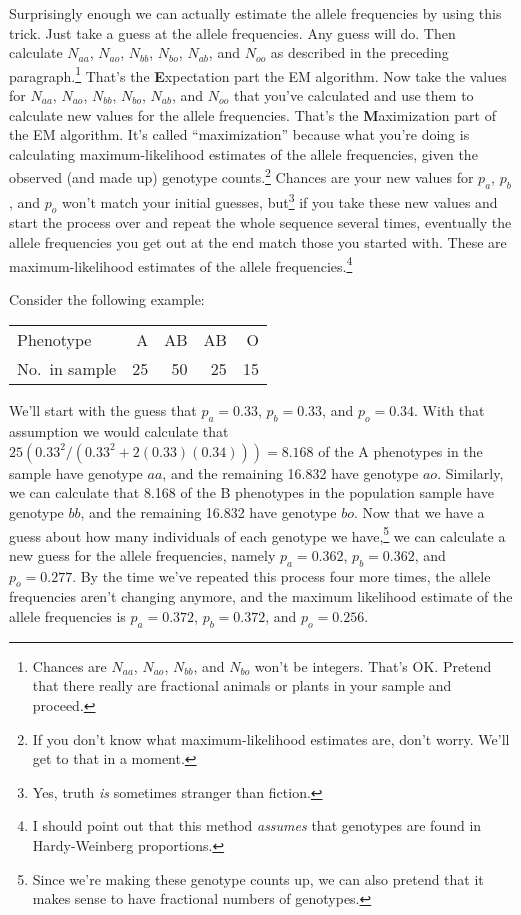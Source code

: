 Surprisingly enough we can actually estimate the allele frequencies by
using this trick. Just take a guess at the allele frequencies. Any
guess will do. Then calculate $N_{aa}$, $N_{ao}$, $N_{bb}$, $N_{bo}$,
$N_{ab}$, and $N_{oo}$ as described in the preceding
paragraph.\footnote{Chances are $N_{aa}$, $N_{ao}$, $N_{bb}$, and
  $N_{bo}$ won't be integers. That's OK. Pretend that there really are
  fractional animals or plants in your sample and proceed.} That's the
{\bf E}xpectation part the EM algorithm. Now take the values for
$N_{aa}$, $N_{ao}$, $N_{bb}$, $N_{bo}$, $N_{ab}$, and $N_{oo}$ that
you've calculated and use them to calculate new values for the allele
frequencies. That's the {\bf M}aximization part of the EM
algorithm. It's called ``maximization'' because what you're doing is
calculating maximum-likelihood estimates of the allele frequencies,
given the observed (and made up) genotype counts.\footnote{If you
  don't know what maximum-likelihood estimates are, don't worry. We'll
  get to that in a moment.} Chances are your new values for $p_a$,
$p_b$, and $p_o$ won't match your initial guesses, but\footnote{Yes,
  truth {\it is\/} sometimes stranger than fiction.}  if you take
these new values and start the process over and repeat the whole
sequence several times, eventually the allele frequencies you get out
at the end match those you started with. These are maximum-likelihood
estimates of the allele frequencies.\footnote{I should point out that
  this method {\it assumes\/} that genotypes are found in
  Hardy-Weinberg proportions.}

Consider the following example:
\begin{center}
\begin{tabular}{l|rrrr}
\hline\hline
Phenotype      & A      & AB      & AB     & O  \\
No.\ in sample & 25     & 50      & 25     & 15 \\
\hline
\end{tabular}
\end{center}
We'll start with the guess that $p_a = 0.33$, $p_b = 0.33$, and
$p_o = 0.34$. With that assumption we would calculate that
$25(0.33^2/(0.33^2 + 2(0.33)(0.34))) = 8.168$ of the A phenotypes in
the sample have genotype $aa$, and the remaining 16.832 have genotype
$ao$. Similarly, we can calculate that 8.168 of the B phenotypes in
the population sample have genotype $bb$, and the remaining 16.832
have genotype $bo$. Now that we have a guess about how many
individuals of each genotype we have,\footnote{Since we're making
  these genotype counts up, we can also pretend that it makes sense to
  have fractional numbers of genotypes.} we can calculate a new guess
for the allele frequencies, namely $p_a = 0.362$, $p_b = 0.362$, and
$p_o = 0.277$. By the time we've repeated this process four more
times, the allele frequencies aren't changing anymore, and the maximum
likelihood estimate of the allele frequencies is $p_a = 0.372$,
$p_b = 0.372$, and $p_o = 0.256$.

